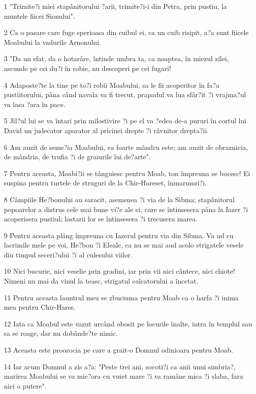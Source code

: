 \par 1 "Trimite?i miei stapânitorului ?arii, trimite?i-i din Petra, prin pustiu, la muntele fiicei Sionului".
\par 2 Ca o pasare care fuge sperioasa din cuibul ei, ca un cuib risipit, a?a sunt fiicele Moabului la vadurile Arnonului.
\par 3 "Da un sfat, da o hotarâre, întinde umbra ta, ca noaptea, în miezul zilei, ascunde pe cei du?i în robie, nu descoperi pe cei fugari!
\par 4 Adaposte?te la tine pe to?i robii Moabului, sa le fii acoperitor în fa?a pustiitorului, pâna când navala va fi trecut, prapadul va lua sfâr?it ?i vrajma?ul va lasa ?ara în pace.
\par 5 Jil?ul lui se va întari prin milostivire ?i pe el va ?edea de-a pururi în cortul lui David un judecator aparator al pricinei drepte ?i râvnitor drepta?ii.
\par 6 Am auzit de seme?ia Moabului, ca foarte mândru este; am auzit de obraznicia, de mândria, de trufia ?i de graiurile lui de?arte".
\par 7 Pentru aceasta, Moabi?ii se tânguiesc pentru Moab, ton împreuna se bocesc! Ei suspina pentru turtele de struguri de la Chir-Hareset, înmarmuri?i.
\par 8 Câmpiile He?bonului au saracit, asemenea ?i via de la Sibma; stapânitorul popoarelor a distrus cele mai bune vi?e ale ei, care se întinsesera pâna la Iazer ?i acoperisera pustiul; lastarii lor se întinsesera ?i trecusera marea.
\par 9 Pentru aceasta plâng împreuna cu Iazerul pentru via din Sibma. Va ud cu lacrimile mele pe voi, He?bon ?i Eleale, ca nu se mai aud acolo strigatele vesele din timpul seceri?ului ?i al culesului viilor.
\par 10 Nici bucurie, nici veselie prin gradini, iar prin vii nici cântece, nici chiote! Nimeni nu mai da vinul la teasc, strigatul calcatorului a încetat.
\par 11 Pentru aceasta launtrul meu se zbuciuma pentru Moab ca o harfa ?i inima mea pentru Chir-Hares.
\par 12 Iata ca Moabul este vazut urcând obosit pe locurile înalte, intra în templul sau sa se roage, dar nu dobânde?te nimic.
\par 13 Aceasta este proorocia pe care a grait-o Domnul odinioara pentru Moab.
\par 14 Iar acum Domnul a zis a?a: "Peste trei ani, socoti?i ca anii unui simbria?, marirea Moabului se va mic?ora cu vuiet mare ?i va ramâne mica ?i slaba, fara nici o putere".

